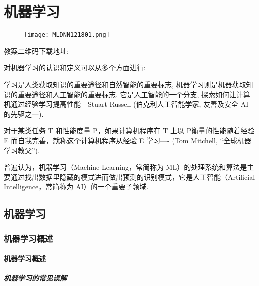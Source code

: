 \chapter{机器学习}\label{AI32PChapter7}
\begin{figure}[H]
\centering
\texttt{[image: MLDNN121801.png]}
\label{MLDNN12019121501}
\end{figure}
教案二维码下载地址: 

对机器学习的认识和定义可以从多个方面进行:
\begin{tcolorbox}[colback=white!50,colframe=orange!50,title=机器学习]
学习是人类获取知识的重要途径和自然智能的重要标志, 机器学习则是机器获取知识的重要途径和人工智能的重要标志.
它是人工智能的一个分支, 探索如何让计算机通过经验学习提高性能---Stuart Russell (伯克利人工智能学家, 友善及安全 AI 的先驱之一).
\end{tcolorbox}
\begin{tcolorbox}[colback=white!50,colframe=orange!50,title=机器学习]
对于某类任务 T 和性能度量 P，如果计算机程序在 T 上以 P衡量的性能随着经验 E 而自我完善，就称这个计算机程序从经验 E 学习---- (Tom Mitchell, “全球机器学习教父”).
\hfill
\end{tcolorbox}
普遍认为，机器学习（Machine Learning，常简称为 ML）的处理系统和算法是主要通过找出数据里隐藏的模式进而做出预测的识别模式，它是人工智能（Artificial Intelligence，常简称为 AI）的一个重要子领域.
\section{机器学习}
\subsection{机器学习概述}
\subsubsection{机器学习概述}
\paragraph{机器学习的常见误解}

